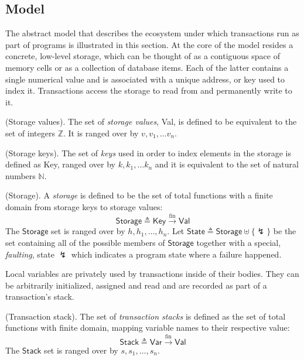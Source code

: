 \subsection{Model}

\label{sec:2plMod}

The abstract model that describes the ecosystem under which transactions run as part of programs is illustrated in this section. At the core of the model resides a concrete, low-level storage, which can be thought of as a contiguous space of memory cells or as a collection of database items. Each of the latter contains a single numerical value and is associated with a unique address, or key used to index it. Transactions access the storage to read from and permanently write to it.

\begin{defn}
	(Storage values).
	The set of \emph{storage values}, \textsf{Val}, is defined to be equivalent to the set of integers $\mathds{Z}$. It is ranged over by $v, v_1, \ldots v_n$.
\end{defn}

\begin{defn}
	(Storage keys).
	The set of \emph{keys} used in order to index elements in the storage is defined as \textsf{Key}, ranged over by $k, k_1, \ldots k_n$ and it is equivalent to the set of natural numbers $\mathds{N}$.
\end{defn}

\begin{defn}
	(Storage).
	A \emph{storage} is defined to be the set of total functions with a finite domain from storage keys to storage values:
	\[
		\mathsf{Storage} \triangleq \mathsf{Key} \xrightarrow{\text{fin}} \mathsf{Val}
	\]
	The $\mathsf{Storage}$ set is ranged over by $h, h_1, \ldots, h_n$. Let $\mathsf{State} \triangleq \mathsf{Storage} \uplus \{\lightning\}$ be the set containing all of the possible members of $\mathsf{Storage}$ together with a special, \textit{faulting}, state $\lightning$ which indicates a program state where a failure happened.	
\end{defn}

Local variables are privately used by transactions inside of their bodies. They can be arbitrarily initialized, assigned and read and are recorded as part of a transaction's stack.
\begin{defn}
	(Transaction stack).
	The set of \emph{transaction stacks} is defined as the set of total functions with finite domain, mapping variable names to their respective value:
	\[
		\mathsf{Stack} \triangleq \mathsf{Var} \xrightarrow{\text{fin}} \mathsf{Val}
	\]
	The $\mathsf{Stack}$ set is ranged over by $s, s_1, \ldots, s_n$.
\end{defn}


